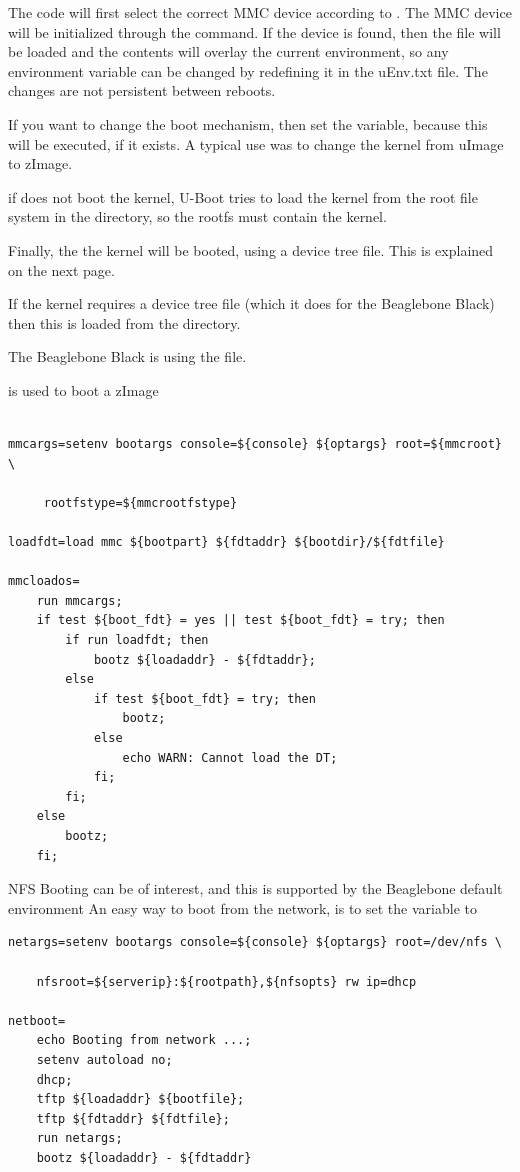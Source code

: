 The  code will first select the correct MMC device according to .
The MMC device will be initialized through the  command.
If the device is found, then the file  will be loaded and the contents
will overlay the current environment, so any environment variable can be 
changed by redefining it in the uEnv.txt file. The changes are not persistent between reboots.

If you want to change the boot mechanism, then set the  variable,
because this will be executed, if it exists.
A typical use was to change the kernel from uImage to zImage.

if  does not boot the kernel, U-Boot tries to load the kernel from the root file system
in the  directory, so the rootfs must contain the kernel.

Finally, the the kernel will be booted, using a device tree file.
This is explained on the next page.

\clearpage

If the kernel requires a device tree file (which it does for the Beaglebone Black)
then this is loaded from the  directory.

The Beaglebone Black is using the  file.

 is used to boot a zImage

\begin{lstlisting}

mmcargs=setenv bootargs console=${console} ${optargs} root=${mmcroot} \

	 rootfstype=${mmcrootfstype}

loadfdt=load mmc ${bootpart} ${fdtaddr} ${bootdir}/${fdtfile}

mmcloados=
	run mmcargs;
	if test ${boot_fdt} = yes || test ${boot_fdt} = try; then 
		if run loadfdt; then 
			bootz ${loadaddr} - ${fdtaddr}; 
		else 
			if test ${boot_fdt} = try; then 
				bootz; 
			else
				echo WARN: Cannot load the DT; 
			fi; 
		fi; 
	else 
		bootz; 
	fi;
\end{lstlisting}

NFS Booting can be of interest, and this is supported by the Beaglebone default environment
An easy way to boot from the network, is to set the  variable to 

\begin{lstlisting}
netargs=setenv bootargs console=${console} ${optargs} root=/dev/nfs \

	nfsroot=${serverip}:${rootpath},${nfsopts} rw ip=dhcp

netboot=
	echo Booting from network ...;
	setenv autoload no; 
	dhcp; 
	tftp ${loadaddr} ${bootfile}; 
	tftp ${fdtaddr} ${fdtfile}; 
	run netargs; 
	bootz ${loadaddr} - ${fdtaddr}
\end{lstlisting}

